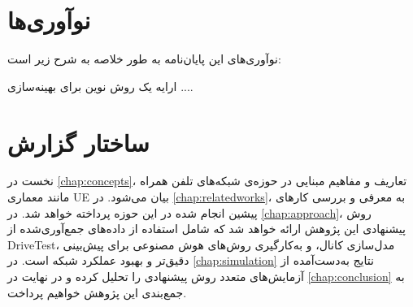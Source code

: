 \section{نوآوری‌ها}
نوآوری‌های این پایان‌نامه به طور خلاصه به شرح زیر است:
 \begin{itemize} 
 \tick 
ارایه یک روش نوین برای بهینه‌سازی ....
 \end{itemize}
 

\section{ساختار گزارش}
نخست در
\autoref{chap:concepts}،
تعاریف و مفاهیم مبنایی در حوزه‌ی شبکه‌های تلفن همراه مانند معماری 
\gls{UE}
بیان می‌شود. در
\autoref{chap:relatedworks}،
به معرفی و بررسی کارهای پیشین انجام شده در این حوزه پرداخته خواهد شد. در 
\autoref{chap:approach}،
روش پیشنهادی این پژوهش ارائه خواهد شد که شامل استفاده از داده‌های جمع‌آوری‌شده از \gls{DriveTest}، مدل‌سازی کانال، و به‌کارگیری روش‌های هوش مصنوعی برای پیش‌بینی دقیق‌تر و بهبود عملکرد شبکه است. در 
\autoref{chap:simulation}
نتایج به‌دست‌آمده از آزمایش‌های متعدد روش پیشنهادی را تحلیل کرده و در نهایت در
\autoref{chap:conclusion}
به جمع‌بندی این پژوهش خواهیم پرداخت.
